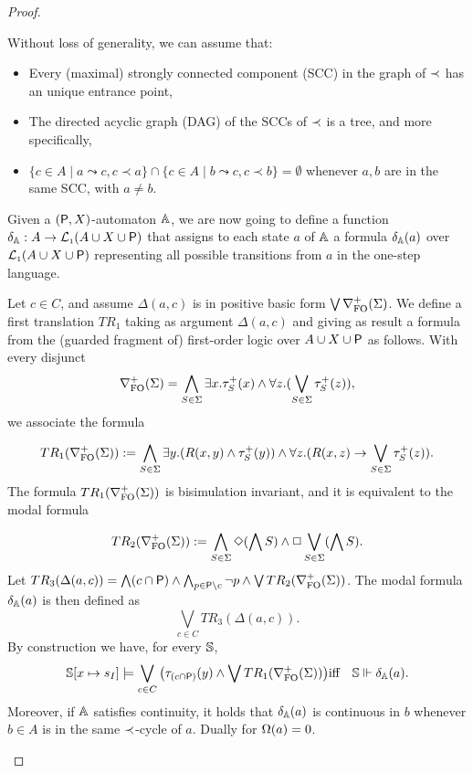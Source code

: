 \begin{proof}
\begin{pfclaim}
Without loss of generality, we can assume that:
\begin{itemize}
 pt
\item Every (maximal) strongly connected component (SCC) in the graph of $\prec$ has an unique entrance point,
\item The directed acyclic graph (DAG) of the SCCs of $\prec$ is a tree, and more specifically,
\item 
$\{c \in A \mid a \leadsto c, c \prec a\}  \cap \{c \in A \mid b \leadsto c, c \prec b\}  = \emptyset$ whenever $a,b$ are in the same SCC, with $a\neq b$.
\end{itemize}

Given a $(\mathsf{P},X)$-automaton $\mathbb{A}$, we are now going to define a function $\delta_\mathbb{A}: A \to \mathcal{L}_{\scriptscriptstyle 1} (A \cup X \cup \mathsf{P})$
that assigns to each state $a$ of $\mathbb{A}$ a formula $\delta_\mathbb{A}(a)$ over $\mathcal{L}_{\scriptscriptstyle 1}(A \cup X \cup \mathsf{P})$ representing all possible transitions from $a$ in the one-step language.  

Let $c \in C$, and assume $\Delta(a,c)$ is in positive basic form $\bigvee \nabla^+_{\mathrm{FO}}(\Sigma)$. We define a first translation $TR_1$ taking as argument $\Delta(a,c)$ and giving as result a formula from the (guarded fragment of) first-order logic over $A \cup X \cup \mathsf{P}$ as follows. %
With every disjunct
$$
\nabla^+_{\mathrm{FO}}(\Sigma) = \bigwedge_{S\in\Sigma} \exists x. \tau^+_{S}(x) \land \forall z.( \bigvee_{S\in \Sigma} \tau^+_S(z)),
$$
we associate the formula

$$
TR_1(\nabla^+_{\mathrm{FO}}(\Sigma)) := \bigwedge_{S\in\Sigma} \exists y. (R(x,y) \land \tau^+_{S}(y)) \land \forall z.( R(x,z) \to \bigvee_{S\in \Sigma} \tau^+_S(z)).
$$
The formula $TR_1(\nabla^+_{\mathrm{FO}}(\Sigma))$ is bisimulation invariant, and it is equivalent to the modal formula

$$
TR_2(\nabla^+_{\mathrm{FO}}(\Sigma)) := \bigwedge_{S\in\Sigma}  \Diamond(\bigwedge S) \land \Box \bigvee_{S\in \Sigma} (\bigwedge S).
$$
Let $TR_3(\Delta(a,c))= \bigwedge (c \cap \mathsf{P}) \land \bigwedge_{p \in \mathsf{P} \setminus c} \lnot p \land \bigvee TR_2(\nabla^+_{\mathrm{FO}}(\Sigma))$.
 The modal formula $\delta_\mathbb{A}(a)$ is then defined as
 \[
 \bigvee_{c \in C} TR_3(\Delta(a,c)).
 \]
By construction we have, for every $\mathbb{S}$,
    \begin{eqnarray*}
    \model[x\mapsto s_I] \models \bigvee_{c \in C} \big (\tau_{(c \cap \prop)}(y) \land \bigvee TR_1(\posdbnfofo{\Sigma})\big) & \text{iff} &\model \mmodels \delta_\aut(a).
    \end{eqnarray*}
Moreover, if $\mathbb{A}$ satisfies continuity, it holds that $\delta_\mathbb{A}(a)$ is continuous in $b$ whenever $b \in A$ is in the same $\prec$-cycle of $a$. Dually for $\Omega(a)=0$.



\end{pfclaim}
\end{proof}
